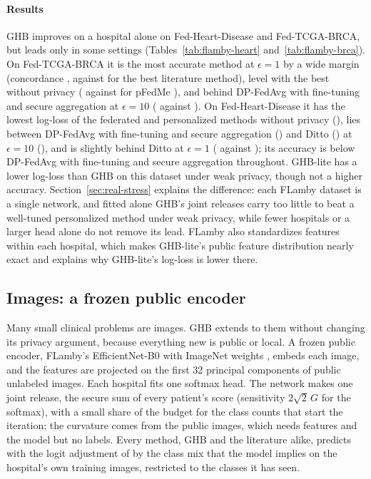 \paragraph{Results} GHB improves on a hospital alone on Fed-Heart-Disease and Fed-TCGA-BRCA, but leads only in some settings (Tables~\ref{tab:flamby-heart} and~\ref{tab:flamby-brca}). On Fed-TCGA-BRCA it is the most accurate method at $\epsilon=1$ by a wide margin (concordance \SimFBrcaOneVFive, against \SimFBrcaOneFTSA{} for the best literature method), level with the best without privacy (\SimFBrcaInfVFive{} against \SimFBrcaInfPFedMe{} for pFedMe \cite{tdinh2020personalized}), and behind DP-FedAvg \cite{mcmahan2018learning} with fine-tuning and secure aggregation at $\epsilon=10$ (\SimFBrcaTenFTSA{} against \SimFBrcaTenVFive). On Fed-Heart-Disease it has the lowest log-loss of the federated and personalized methods without privacy (\SimFHeartInfVFive), lies between DP-FedAvg with fine-tuning and secure aggregation (\SimFHeartTenFTSA) and Ditto \cite{li2021ditto} (\SimFHeartTenDitto) at $\epsilon=10$ (\SimFHeartTenVFive), and is slightly behind Ditto at $\epsilon=1$ (\SimFHeartOneVFive{} against \SimFHeartOneDitto); its accuracy is below DP-FedAvg with fine-tuning and secure aggregation throughout. GHB-lite has a lower log-loss than GHB on this dataset under weak privacy, though not a higher accuracy. Section~\ref{sec:real-stress} explains the difference: each FLamby dataset is a single network, and fitted alone GHB's joint releases carry too little to beat a well-tuned personalized method under weak privacy, while fewer hospitals or a larger head alone do not remove its lead. FLamby also standardizes features within each hospital, which makes GHB-lite's public feature distribution nearly exact and explains why GHB-lite's log-loss is lower there.

\subsection{Images: a frozen public encoder}\label{sec:real-images}

Many small clinical problems are images. GHB extends to them without changing its privacy argument, because everything new is public or local. A frozen public encoder, FLamby's EfficientNet-B0 with ImageNet weights \cite{ogierduterrail2022flamby,tan2019efficientnet}, embeds each image, and the features are projected on the first 32 principal components of public unlabeled images. Each hospital fits one softmax head. The network makes one joint release, the secure sum of every patient's score (sensitivity $2\sqrt2\,G$ for the softmax), with a small share of the budget for the class counts that start the iteration; the curvature comes from the public images, which needs features and the model but no labels. Every method, GHB and the literature alike, predicts with the logit adjustment of \cite{menon2021longtail} by the class mix that the model implies on the hospital's own training images, restricted to the classes it has seen.

